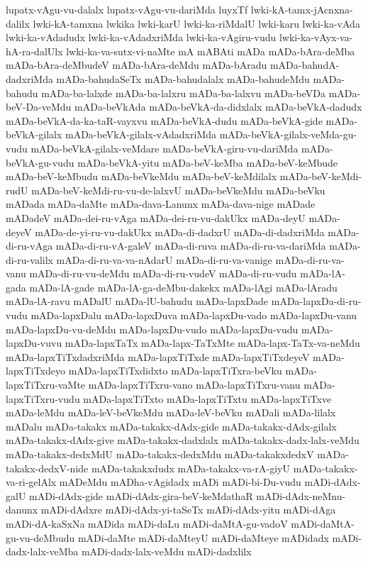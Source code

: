 {lupatx-vAgu-vu-dalalx
lupatx-vAgu-vu-dariMda
luyxTf
lwki-kA-tamx-jAcnxna-dalilx
lwki-kA-tamxna
lwkika
lwki-karU
lwki-ka-riMdalU
lwki-karu
lwki-ka-vAda
lwki-ka-vAdadudx
lwki-ka-vAdadxriMda
lwki-ka-vAgiru-vudu
lwki-ka-vAyx-va-hA-ra-dalUlx
lwki-ka-va-sutx-vi-naMte
mA
mABAti
mADa
mADa-bAra-deMba
mADa-bAra-deMbudeV
mADa-bAra-deMdu
mADa-bAradu
mADa-bahudA-dadxriMda
mADa-bahudaSeTx
mADa-bahudalalx
mADa-bahudeMdu
mADa-bahudu
mADa-ba-lalxde
mADa-ba-lalxru
mADa-ba-lalxvu
mADa-beVDa
mADa-beV-Da-veMdu
mADa-beVkAda
mADa-beVkA-da-didxlalx
mADa-beVkA-dadudx
mADa-beVkA-da-ka-taR-vayxvu
mADa-beVkA-dudu
mADa-beVkA-gide
mADa-beVkA-gilalx
mADa-beVkA-gilalx-vAdadxriMda
mADa-beVkA-gilalx-veMda-gu-vudu
mADa-beVkA-gilalx-veMdare
mADa-beVkA-giru-vu-dariMda
mADa-beVkA-gu-vudu
mADa-beVkA-yitu
mADa-beV-keMba
mADa-beV-keMbude
mADa-beV-keMbudu
mADa-beVkeMdu
mADa-beV-keMdilalx
mADa-beV-keMdi-rudU
mADa-beV-keMdi-ru-vu-de-lalxvU
mADa-beVkeMdu
mADa-beVku
mADada
mADa-daMte
mADa-dava-Lanunx
mADa-dava-nige
mADade
mADadeV
mADa-dei-ru-vAga
mADa-dei-ru-vu-dakUkx
mADa-deyU
mADa-deyeV
mADa-de-yi-ru-vu-dakUkx
mADa-di-dadxrU
mADa-di-dadxriMda
mADa-di-ru-vAga
mADa-di-ru-vA-galeV
mADa-di-ruva
mADa-di-ru-va-dariMda
mADa-di-ru-valilx
mADa-di-ru-va-va-nAdarU
mADa-di-ru-va-vanige
mADa-di-ru-va-vanu
mADa-di-ru-vu-deMdu
mADa-di-ru-vudeV
mADa-di-ru-vudu
mADa-lA-gada
mADa-lA-gade
mADa-lA-ga-deMbu-dakekx
mADa-lAgi
mADa-lAradu
mADa-lA-ravu
mADalU
mADa-lU-bahudu
mADa-lapxDade
mADa-lapxDa-di-ru-vudu
mADa-lapxDalu
mADa-lapxDuva
mADa-lapxDu-vado
mADa-lapxDu-vanu
mADa-lapxDu-vu-deMdu
mADa-lapxDu-vudo
mADa-lapxDu-vudu
mADa-lapxDu-vuvu
mADa-lapxTaTx
mADa-lapx-TaTxMte
mADa-lapx-TaTx-va-neMdu
mADa-lapxTiTxdadxriMda
mADa-lapxTiTxde
mADa-lapxTiTxdeyeV
mADa-lapxTiTxdeyo
mADa-lapxTiTxdidxto
mADa-lapxTiTxra-beVku
mADa-lapxTiTxru-vaMte
mADa-lapxTiTxru-vano
mADa-lapxTiTxru-vanu
mADa-lapxTiTxru-vudu
mADa-lapxTiTxto
mADa-lapxTiTxtu
mADa-lapxTiTxve
mADa-leMdu
mADa-leV-beVkeMdu
mADa-leV-beVku
mADali
mADa-lilalx
mADalu
mADa-takakx
mADa-takakx-dAdx-gide
mADa-takakx-dAdx-gilalx
mADa-takakx-dAdx-give
mADa-takakx-dadxlalx
mADa-takakx-dadx-lalx-veMdu
mADa-takakx-dedxMdU
mADa-takakx-dedxMdu
mADa-takakxdedxV
mADa-takakx-dedxV-nide
mADa-takakxdudx
mADa-takakx-va-rA-giyU
mADa-takakx-va-ri-gelAlx
mADeMdu
mADha-vAgidadx
mADi
mADi-bi-Du-vudu
mADi-dAdx-galU
mADi-dAdx-gide
mADi-dAdx-gira-beV-keMdathaR
mADi-dAdx-neMnu-danunx
mADi-dAdxre
mADi-dAdx-yi-taSeTx
mADi-dAdx-yitu
mADi-dAga
mADi-dA-kaSxNa
mADida
mADi-daLu
mADi-daMtA-gu-vadoV
mADi-daMtA-gu-vu-deMbudu
mADi-daMte
mADi-daMteyU
mADi-daMteye
mADidadx
mADi-dadx-lalx-veMba
mADi-dadx-lalx-veMdu
mADi-dadxlilx
}
